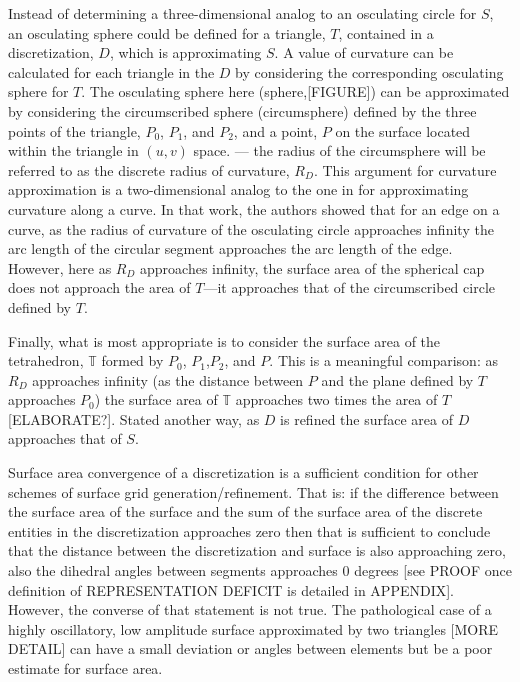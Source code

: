 Instead of determining a three-dimensional analog to an osculating
circle for $S$, an osculating sphere could be defined for a triangle,
$T$, contained in a discretization, $D$, which is approximating $S$. A
value of curvature can be calculated for each triangle in the $D$ by
considering the corresponding osculating sphere for $T$. The osculating
sphere here (sphere,[FIGURE]) can be approximated by considering the
circumscribed sphere (circumsphere) \cite{casey1888} defined by the
three points of the triangle, $P_0$, $P_1$, and $P_2$, and a point, $P$
on the surface located within the triangle in $(u,v)$ space. --- the
radius of the circumsphere will be referred to as the discrete radius of
curvature, $R_D$. This argument for curvature approximation is a
two-dimensional analog to the one in \cite{mclaurin12} for approximating
curvature along a curve. In that work, the authors showed that for an
edge on a curve, as the radius of curvature of the osculating circle
approaches infinity the arc length of the circular segment approaches
the arc length of the edge. However, here as $R_D$ approaches infinity,
the surface area of the spherical cap does not approach the area of
$T$---it approaches that of the circumscribed circle defined by $T$.

Finally, what is most appropriate is to consider the surface area of the
tetrahedron, ${\mathbb T}$ formed by $P_0$, $P_1$,$P_2$, and $P$. This
is a meaningful comparison: as $R_D$ approaches infinity (as the
distance between $P$ and the plane defined by $T$ approaches $P_0$) the
surface area of ${\mathbb T}$ approaches two times the area of
$T$[ELABORATE?].  Stated another way, as $D$ is refined the surface area
of $D$ approaches that of $S$.

Surface area convergence of a discretization is a sufficient condition
for other schemes of surface grid generation/refinement. That is: if the
difference between the surface area of the surface and the sum of the
surface area of the discrete entities in the discretization approaches
zero then that is sufficient to conclude that the distance between the
discretization and surface is also approaching zero, also the dihedral
angles between segments approaches $0$ degrees [see PROOF once
definition of REPRESENTATION DEFICIT is detailed in APPENDIX]. However,
the converse of that statement is not true. The pathological case of a
highly oscillatory, low amplitude surface approximated by two triangles
[MORE DETAIL] can have a small deviation or angles between elements
but be a poor estimate for surface area.
